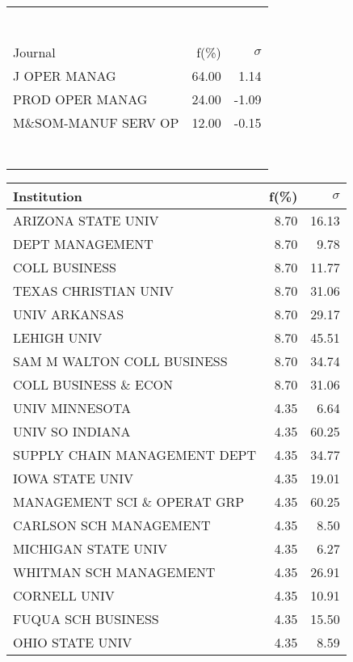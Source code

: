 \documentclass[a4paper,11pt]{report}
\begin{document}
\begin{landscape}
\begin{table}[!ht]
{\begin{tabular}{|l r  r|}
 &  & \\
 &  & \\
 &  & \\
 &  & \\
 &  & \\
 &  & \\
 &  & \\
\hline
\hline
Journal & f(\%) & $\sigma$\\
\hline
J OPER MANAG & 64.00 & 1.14\\
PROD OPER MANAG & 24.00 & -1.09\\
M\&SOM-MANUF SERV OP & 12.00 & -0.15\\
 &  & \\
 &  & \\
 &  & \\
 &  & \\
 &  & \\
 &  & \\
 &  & \\
\hline
\end{tabular}
}
{\scriptsize\begin{tabular}{|l r r|}
\hline
Institution & f(\%) & $\sigma$\\
\hline
ARIZONA STATE UNIV & 8.70 & 16.13\\
DEPT MANAGEMENT & 8.70 & 9.78\\
COLL BUSINESS & 8.70 & 11.77\\
TEXAS CHRISTIAN UNIV & 8.70 & 31.06\\
UNIV ARKANSAS & 8.70 & 29.17\\
LEHIGH UNIV & 8.70 & 45.51\\
SAM M WALTON COLL BUSINESS & 8.70 & 34.74\\
COLL BUSINESS \& ECON & 8.70 & 31.06\\
UNIV MINNESOTA & 4.35 & 6.64\\
UNIV SO INDIANA & 4.35 & 60.25\\
SUPPLY CHAIN MANAGEMENT DEPT & 4.35 & 34.77\\
IOWA STATE UNIV & 4.35 & 19.01\\
MANAGEMENT SCI \& OPERAT GRP & 4.35 & 60.25\\
CARLSON SCH MANAGEMENT & 4.35 & 8.50\\
MICHIGAN STATE UNIV & 4.35 & 6.27\\
WHITMAN SCH MANAGEMENT & 4.35 & 26.91\\
CORNELL UNIV & 4.35 & 10.91\\
FUQUA SCH BUSINESS & 4.35 & 15.50\\
OHIO STATE UNIV & 4.35 & 8.59\\

\end{tabular}}
\end{table}
\end{landscape}
\end{document}
